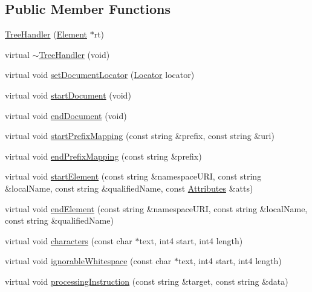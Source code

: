 \subsection*{Public Member Functions}
\begin{DoxyCompactItemize}
\item 
\mbox{\hyperlink{class_tree_handler_adbeb3ebf438c6dc905063d1f321e0c72}{Tree\+Handler}} (\mbox{\hyperlink{class_element}{Element}} $\ast$rt)
\item 
virtual \mbox{\hyperlink{class_tree_handler_a8071a1e15bcb2af456ccfce616cc2724}{$\sim$\+Tree\+Handler}} (void)
\item 
virtual void \mbox{\hyperlink{class_tree_handler_af72fb7d4af5500674084e45076b261af}{set\+Document\+Locator}} (\mbox{\hyperlink{xml_8hh_ad34bc338f5e298a1993320898263b741}{Locator}} locator)
\item 
virtual void \mbox{\hyperlink{class_tree_handler_a07e8d7c372805a366c14683f4d4a0cb3}{start\+Document}} (void)
\item 
virtual void \mbox{\hyperlink{class_tree_handler_abe5bde3cb1ac0f928ddfef83921f455f}{end\+Document}} (void)
\item 
virtual void \mbox{\hyperlink{class_tree_handler_a086404533a2eca59f3efddbcc0e35c06}{start\+Prefix\+Mapping}} (const string \&prefix, const string \&uri)
\item 
virtual void \mbox{\hyperlink{class_tree_handler_ac4634964bc8b641168519c844cafaaf6}{end\+Prefix\+Mapping}} (const string \&prefix)
\item 
virtual void \mbox{\hyperlink{class_tree_handler_a6bd0480fcc5176e1ec06148aa7d2bff3}{start\+Element}} (const string \&namespace\+U\+RI, const string \&local\+Name, const string \&qualified\+Name, const \mbox{\hyperlink{class_attributes}{Attributes}} \&atts)
\item 
virtual void \mbox{\hyperlink{class_tree_handler_a1db61f3d4f1425dcdd82166ea636fd4f}{end\+Element}} (const string \&namespace\+U\+RI, const string \&local\+Name, const string \&qualified\+Name)
\item 
virtual void \mbox{\hyperlink{class_tree_handler_a40a58757a18ccf3b2b272d49b5478893}{characters}} (const char $\ast$text, int4 start, int4 length)
\item 
virtual void \mbox{\hyperlink{class_tree_handler_a9364537779e9dd81b59f3572343d3207}{ignorable\+Whitespace}} (const char $\ast$text, int4 start, int4 length)
\item 
virtual void \mbox{\hyperlink{class_tree_handler_aca0bd5378ea9bc32f218b47be7202b00}{processing\+Instruction}} (const string \&target, const string \&data)

\end{DoxyCompactItemize}
